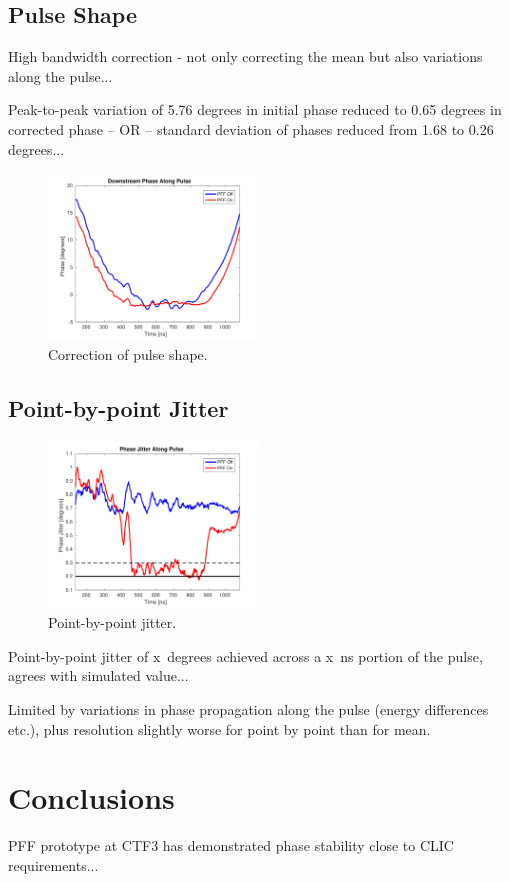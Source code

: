 \documentclass[%
 reprint,
 amsmath,amssymb,
 aps,
]{revtex4-1}
\begin{document}
\subsection{\label{ss:shape}Pulse Shape}

High bandwidth correction - not only correcting the mean but also variations along the pulse...

Peak-to-peak variation of 5.76 degrees in initial phase reduced to 0.65 degrees in corrected phase -- OR -- standard deviation of phases reduced from 1.68 to 0.26 degrees...

\begin{figure}
\includegraphics[width=0.5\textwidth]{figs/BestFF_shape}%
\caption{\label{fig:shape}Correction of pulse shape.}
\end{figure}

\subsection{\label{ss:pbpJit}Point-by-point Jitter}

\begin{figure}
\includegraphics[width=0.5\textwidth]{figs/BestFF_pbp}%
\caption{\label{fig:BestFF_pbp}Point-by-point jitter.}
\end{figure}


Point-by-point jitter of x~degrees achieved across a x~ns portion of the pulse, agrees with simulated value...

Limited by variations in phase propagation along the pulse (energy differences etc.), plus resolution slightly worse for point by point than for mean.



\section{\label{s:conc}Conclusions}

PFF prototype at CTF3 has demonstrated phase stability close to CLIC requirements...

\end{document}
